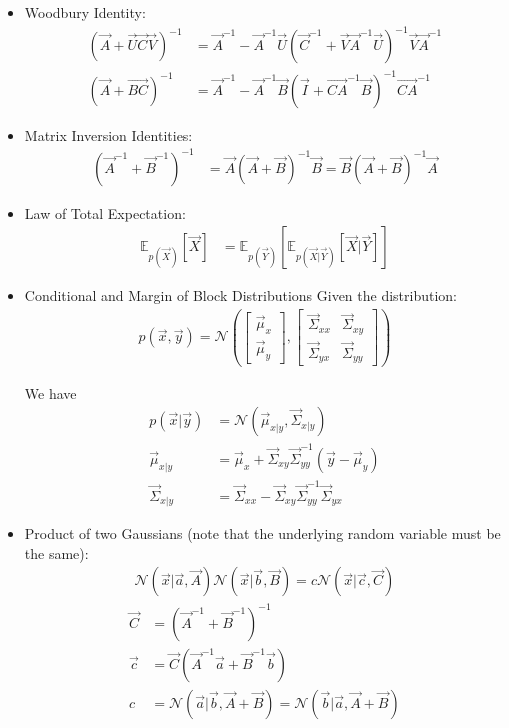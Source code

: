 \documentclass[12pt,twoside]{article}
\begin{document}
\begin{itemize}
\item Woodbury Identity:
	\begin{align*}
		(\vec{A} + \vec{U}\vec{C}\vec{V})^{-1} &= \vec{A}^{-1}-\vec{A}^{-1} \vec{U}(\vec{C}^{-1}+\vec{V}\vec{A}^{-1}\vec{U})^{-1}\vec{V}\vec{A}^{-1}\\
			(\vec{A} + \vec{BC})^{-1}& = \vec{A}^{-1} - \vec{A}^{-1}\vec{B} (\vec{I} + \vec{CA}^{-1}\vec{B})^{-1}\vec{CA}^{-1} 
	\end{align*}

\item Matrix Inversion Identities:
	\begin{align*}
		(\vec{A}^{-1} + \vec{B}^{-1})^{-1} &= \vec{A}(\vec{A}+\vec{B})^{-1}\vec{B} =  \vec{B}(\vec{A}+\vec{B})^{-1}\vec{A}
	\end{align*}

\item Law of Total Expectation:
	\begin{align*}
		\mathbb{E}_{p(\vec{X})}[\vec{X}] & =\mathbb{E}_{p(\vec{Y})}[\mathbb{E}_{p(\vec{X}\vert\vec{Y})}[\vec{X}\vert \vec{Y}]] 
	\end{align*}


\item Conditional and Margin of Block Distributions
Given the distribution:
\begin{align*}
	p(\vec{x},\vec{y}) = \mathcal{N}\left(
	\begin{bmatrix}
	\vec{\mu}_x\\
	\vec{\mu}_y
	\end{bmatrix},
	\begin{bmatrix}
	\vec{\Sigma}_{xx}	& \vec{\Sigma}_{xy}\\
	\vec{\Sigma}_{yx}	& \vec{\Sigma}_{yy}
	\end{bmatrix}
	\right)
\end{align*}

We have
\begin{align*}
	p(\vec{x}\vert \vec{y})
	& = \mathcal{N}\left(\vec{\mu}_{x\vert y}, \vec{\Sigma}_{x\vert y}\right)\\
	\vec{\mu}_{x\vert y}
	&=\vec{\mu}_x+ \vec{\Sigma}_{xy}\vec{\Sigma}_{yy}^{-1}(\vec {y} - \vec{\mu}_y)\\
	\vec{\Sigma}_{x\vert y}
	&=\vec{\Sigma}_{xx} - \vec{\Sigma}_{xy}\vec{\Sigma}_{yy}^{-1}\vec{\Sigma}_{yx}
\end{align*}

\item Product of two Gaussians (note that the underlying random variable must be the same):
	\begin{align*}
		\mathcal{N}(\vec{x}\vert \vec{a}, \vec{A})\mathcal{N}(\vec{x}\vert \vec{b}, \vec{B})= c\mathcal{N}(\vec{x}\vert \vec{c}, \vec{C})
	\end{align*}
	\begin{align*}
		\vec{C} &= (\vec{A}^{-1}+\vec{B}^{-1})^{-1}\\
		\vec{c} &= \vec{C}(\vec{A}^{-1}\vec{a}+\vec{B}^{-1}\vec{b})\\
		c& = \mathcal{N}(\vec{a}\vert \vec{b}, \vec{A} + \vec{B}) = \mathcal{N}(\vec{b}\vert \vec{a}, \vec{A} + \vec{B})
	\end{align*}


\end{itemize}
\end{document}
